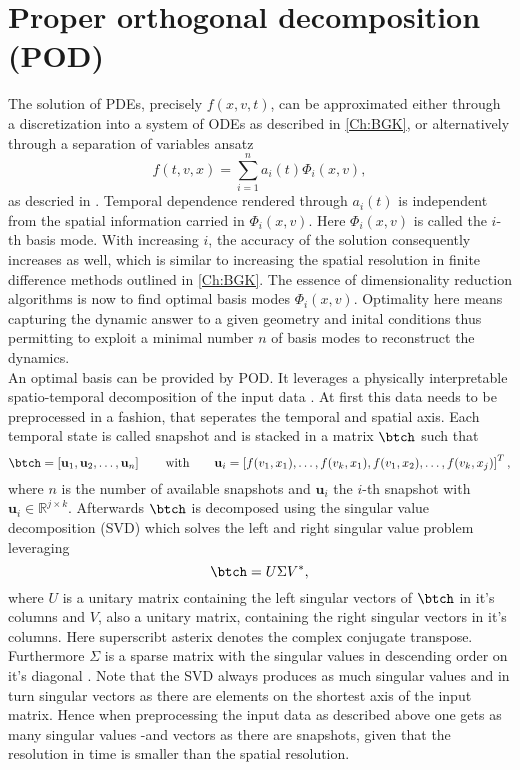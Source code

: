 \section{Proper orthogonal decomposition (POD)}
\label{Sec: POD}
The solution of PDEs, precisely \(f(x,v,t)\), can be approximated either through a discretization into a system of ODEs as described in \cref{Ch:BGK}, or alternatively through a separation of variables ansatz
\begin{equation}
	f(t,v,x) = \sum_{i=1}^n a_i(t)\Phi_i(x,v)\mathrm{,}
\end{equation}  
as descried in \cite{Kutz}. Temporal dependence rendered through \(a_i(t)\) is independent from the spatial information carried in \(\Phi_i(x,v)\). Here \(\Phi_i(x,v)\) is called the \(i\)-th basis mode. With increasing \(i\), the accuracy of the solution consequently increases as well, which is similar to increasing the spatial resolution in finite difference methods outlined in \cref{Ch:BGK}. The essence of dimensionality reduction algorithms is now to find optimal basis modes \(\Phi_i(x,v)\). Optimality here means capturing the dynamic answer to a given geometry and inital conditions thus permitting to exploit a minimal number \(n\) of basis modes to reconstruct the dynamics.\\
An optimal basis can be provided by POD. It leverages a physically interpretable spatio-temporal decomposition of the input data \cite{Kutz}. At first this data needs to be preprocessed in a fashion, that seperates the temporal and spatial axis. Each temporal state is called snapshot and is stacked in a matrix \(\btch\) such that
\begin{equation}
	\btch=\left[ \mathbf{u}_{1},\mathbf{u}_2,\dots,\mathbf{u}_n \right] \qquad \mathrm{with}\qquad \mathbf{u}_i=\left[f(v_1,x_1),\dots,f(v_k,x_1),f(v_1,x_2),\dots,f(v_k,x_j)\right]^T \mathrm{,}
	\label{Eq:PiPOD}
\end{equation}
where \(n\) is the number of available snapshots and \(\mathbf{u}_i\) the \(i\)-th snapshot with \(\mathbf{u}_i \in \mathbb{R}^{j\times k}\). Afterwards \(\btch\) is decomposed using the singular value decomposition (SVD) which solves the left and right singular value problem leveraging
\begin{equation}
\btch = U\Sigma V^*\mathrm{,}
\end{equation}
where \(U\) is a unitary matrix containing the left singular vectors of \(\btch\) in it's columns and \(V\), also a unitary matrix, containing the right singular vectors in it's columns. Here superscribt asterix denotes the complex conjugate transpose. Furthermore \(\Sigma\) is a sparse matrix with the singular values in descending order on it's diagonal \cite{Kutz}. Note that the SVD always produces as much singular values and in turn singular vectors as there are elements on the shortest axis of the input matrix. Hence when preprocessing the input data as described above one gets as many singular values -and vectors as there are snapshots, given that the resolution in time is smaller than the spatial resolution.\\
